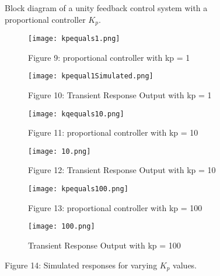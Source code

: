 \documentclass{report}
\begin{document}
\begin{flushleft}
\begin{figure}[H]

\vspace{0.5em}
\caption{Block diagram of a unity feedback control system with a proportional controller \(K_p\).}

\vspace{1.5em}

\begin{subfigure}[b]{0.45\textwidth}
    \centering
    \texttt{[image: kpequals1.png]}
    \caption{Figure 9: proportional controller with kp = 1}
\end{subfigure}
\hfill
\begin{subfigure}[b]{0.45\textwidth}
    \centering
    \texttt{[image: kpequal1Simulated.png]}
    \caption{Figure 10: Transient Response Output with kp = 1}
\end{subfigure}

\vspace{1em}

\begin{subfigure}[b]{0.45\textwidth}
    \centering
    \texttt{[image: kqequals10.png]}
    \caption{Figure 11: proportional controller with kp = 10}
\end{subfigure}
\hfill
\begin{subfigure}[b]{0.45\textwidth}
    \centering
    \texttt{[image: 10.png]}
    \caption{Figure 12: Transient Response Output with kp = 10}
\end{subfigure}

\vspace{1em}

\begin{subfigure}[b]{0.45\textwidth}
    \centering
    \texttt{[image: kpequals100.png]}
    \caption{Figure 13: proportional controller with kp = 100}
\end{subfigure}
\hfill
\begin{subfigure}[b]{0.45\textwidth}
    \centering
    \texttt{[image: 100.png]}
    \caption{Transient Response Output with kp = 100}
\end{subfigure}

\caption*{Figure 14: Simulated responses for varying \(K_p\) values.}


\end{figure}
\end{flushleft}
\end{document}
